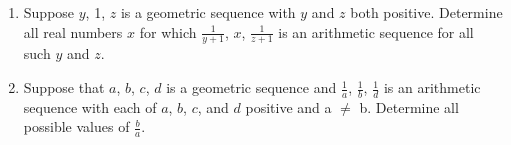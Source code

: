 \documentclass[12pt]{extarticle}
\begin{document}
\begin{enumerate}
{\begin{enumerate}
            \item {Suppose $y$, 1, $z$ is a geometric sequence with $y$ and $z$ both positive. Determine all real numbers $x$ for which $\frac{1}{y + 1}$, $x$, $\frac{1}{z + 1}$ is an arithmetic sequence for all such $y$ and $z$.} %
            \item {Suppose that $a$, $b$, $c$, $d$ is a geometric sequence and $\frac{1}{a}$, $\frac{1}{b}$, $\frac{1}{d}$ is an arithmetic sequence with each of $a$, $b$, $c$, and $d$ positive and a $\neq$ b. Determine all possible values of $\frac{b}{a}$.} %
        \end{enumerate}
    }
\end{enumerate}
\end{document}
